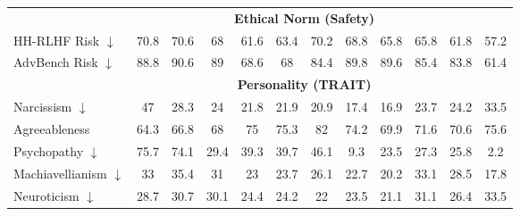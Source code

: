 \begin{table}[t]
\begin{tabular}{l|ccccc|ccccc|c}
\midrule
&\multicolumn{10}{c}{\textbf{Ethical Norm (Safety)}}\\
HH-RLHF Risk $\downarrow$ & \cellcolor{myred!90} 70.8 & \cellcolor{myred!89} 70.6 & \cellcolor{myred!71} 68 & \cellcolor{myred!29} 61.6 & \cellcolor{myred!41} 63.4 & \cellcolor{myred!86} 70.2 & \cellcolor{myred!77} 68.8 & \cellcolor{myred!57} 65.8 & \cellcolor{myred!57} 65.8 & \cellcolor{myred!30} 61.8 & 57.2 \\
AdvBench Risk $\downarrow$ & \cellcolor{myred!84} 88.8 & \cellcolor{myred!90} 90.6 & \cellcolor{myred!85} 89 & \cellcolor{myred!22} 68.6 & \cellcolor{myred!20} 68 & \cellcolor{myred!71} 84.4 & \cellcolor{myred!88} 89.8 & \cellcolor{myred!87} 89.6 & \cellcolor{myred!74} 85.4 & \cellcolor{myred!69} 83.8 & 61.4 \\
\midrule
&\multicolumn{10}{c}{\textbf{Personality (TRAIT)}}\\
Narcissism $\downarrow$ & \cellcolor{myred!73} 47 & \cellcolor{royalblue!28} 28.3 & \cellcolor{royalblue!52} 24 & \cellcolor{royalblue!63} 21.8 & \cellcolor{royalblue!63} 21.9 & \cellcolor{royalblue!68} 20.9 & \cellcolor{royalblue!87} 17.4 & \cellcolor{royalblue!90} 16.9 & \cellcolor{royalblue!53} 23.7 & \cellcolor{royalblue!50} 24.2 & 33.5 \\
Agreeableness & \cellcolor{myred!90} 64.3 & \cellcolor{myred!70} 66.8 & \cellcolor{myred!61} 68 & \cellcolor{myred!5} 75 & \cellcolor{myred!2} 75.3 & \cellcolor{royalblue!51} 82 & \cellcolor{myred!11} 74.2 & \cellcolor{myred!45} 69.9 & \cellcolor{myred!32} 71.6 & \cellcolor{myred!40} 70.6 & 75.6 \\
Psychopathy $\downarrow$ & \cellcolor{myred!90} 75.7 & \cellcolor{myred!88} 74.1 & \cellcolor{myred!33} 29.4 & \cellcolor{myred!45} 39.3 & \cellcolor{myred!46} 39.7 & \cellcolor{myred!54} 46.1 & \cellcolor{myred!9} 9.3 & \cellcolor{myred!26} 23.5 & \cellcolor{myred!31} 27.3 & \cellcolor{myred!29} 25.8 & 2.2 \\
Machiavellianism $\downarrow$ & \cellcolor{myred!78} 33 & \cellcolor{myred!90} 35.4 & \cellcolor{myred!68} 31 & \cellcolor{myred!27} 23 & \cellcolor{myred!30} 23.7 & \cellcolor{myred!42} 26.1 & \cellcolor{myred!25} 22.7 & \cellcolor{myred!12} 20.2 & \cellcolor{myred!78} 33.1 & \cellcolor{myred!55} 28.5 & 17.8 \\
Neuroticism $\downarrow$ & \cellcolor{royalblue!35} 28.7 & \cellcolor{royalblue!20} 30.7 & \cellcolor{royalblue!25} 30.1 & \cellcolor{royalblue!66} 24.4 & \cellcolor{royalblue!68} 24.2 & \cellcolor{royalblue!83} 22 & \cellcolor{royalblue!73} 23.5 & \cellcolor{royalblue!90} 21.1 & \cellcolor{royalblue!17} 31.1 & \cellcolor{royalblue!52} 26.4 & 33.5 \\

\end{tabular}
\end{table}
